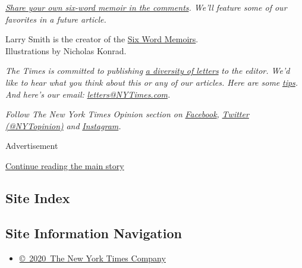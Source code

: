 \href{https://www.nytimes3xbfgragh.onion/2020/09/11/opinion/coronavirus-pandemic-poetry-memoirs.html?action=click\&module=Opinion\&pgtype=Homepage\#commentsContainer}{\emph{Share
your own six-word memoir in the comments}}\emph{. We'll feature some of
our favorites in a future article.}

Larry Smith is the creator of the
\href{https://www.sixwordmemoirs.com/}{Six Word Memoirs}.\\
Illustrations by Nicholas Konrad.

\emph{The Times is committed to publishing}
\href{https://www.nytimes3xbfgragh.onion/2019/01/31/opinion/letters/letters-to-editor-new-york-times-women.html}{\emph{a
diversity of letters}} \emph{to the editor. We'd like to hear what you
think about this or any of our articles. Here are some}
\href{https://help.nytimes3xbfgragh.onion/hc/en-us/articles/115014925288-How-to-submit-a-letter-to-the-editor}{\emph{tips}}\emph{.
And here's our email:}
\href{mailto:letters@NYTimes.com}{\emph{letters@NYTimes.com}}\emph{.}

\emph{Follow The New York Times Opinion section on}
\href{https://www.facebookcorewwwi.onion/nytopinion}{\emph{Facebook}}\emph{,}
\href{http://twitter.com/NYTOpinion}{\emph{Twitter (@NYTopinion)}}
\emph{and}
\href{https://www.instagram.com/nytopinion/}{\emph{Instagram}}\emph{.}

Advertisement

\protect\hyperlink{after-bottom}{Continue reading the main story}

\hypertarget{site-index}{%
\subsection{Site Index}\label{site-index}}

\hypertarget{site-information-navigation}{%
\subsection{Site Information
Navigation}\label{site-information-navigation}}

\begin{itemize}
\tightlist
\item
  \href{https://help.nytimes3xbfgragh.onion/hc/en-us/articles/115014792127-Copyright-notice}{©~2020~The
  New York Times Company}
\end{itemize}

